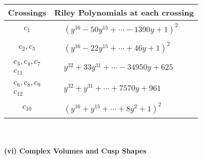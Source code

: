 \documentclass[1p]{elsarticle_modified}
\theoremstyle{definition}
\begin{document}
\begin{tabular}{m{50pt}|m{274pt}}
Crossings & \hspace{64pt}Riley Polynomials at each crossing \\
\hline $$\begin{aligned}c_{1}\end{aligned}$$&$\begin{aligned}
&(y^{16}-50 y^{15}+\cdots-1390 y+1)^{2}
\end{aligned}$\\
\hline $$\begin{aligned}c_{2},c_{5}\end{aligned}$$&$\begin{aligned}
&(y^{16}-22 y^{15}+\cdots+46 y+1)^{2}
\end{aligned}$\\
\hline $$\begin{aligned}c_{3},c_{4},c_{7}\\c_{11}\end{aligned}$$&$\begin{aligned}
&y^{32}+33 y^{31}+\cdots-34950 y+625
\end{aligned}$\\
\hline $$\begin{aligned}c_{6},c_{8},c_{9}\\c_{12}\end{aligned}$$&$\begin{aligned}
&y^{32}+y^{31}+\cdots+7570 y+961
\end{aligned}$\\
\hline $$\begin{aligned}c_{10}\end{aligned}$$&$\begin{aligned}
&(y^{16}+y^{15}+\cdots+8 y^2+1)^{2}
\end{aligned}$\\
\hline
\end{tabular}\\~\\
\newpage\flushleft \textbf{(vi) Complex Volumes and Cusp Shapes}
\end{document}
